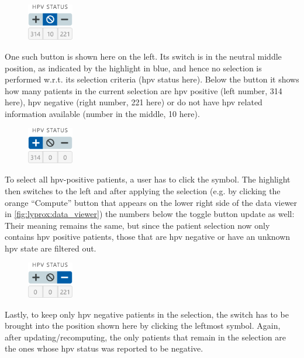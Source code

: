\documentclass[\relativeRoot/main.tex]{subfiles}
\begin{document}
\begin{samepage}
    \setlength\intextsep{0pt}
    \begin{figure}
        \includegraphics[width=0.18\textwidth]{figures/hpv_neutral.png}
    \end{figure}
    One such button is shown here on the left. Its switch is in the neutral middle  position, as indicated by the highlight in blue, and hence no selection is performed w.r.t. its selection criteria (\gls{hpv} status here). Below the button it shows how many patients in the current selection are \gls{hpv} positive (left number, 314 here), \gls{hpv} negative (right number, 221 here) or do not have \gls{hpv} related information available (number in the middle, 10 here).

    \begin{figure}
        \includegraphics[width=0.18\textwidth]{figures/hpv_positive.png}
    \end{figure}
    To select all \gls{hpv}-positive patients, a user has to click the  symbol. The highlight then switches to the left and after applying the selection (e.g. by clicking the orange ``Compute'' button that appears on the lower right side of the data viewer in \cref{fig:lyprox:data_viewer}) the numbers below the toggle button update as well: Their meaning remains the same, but since the patient selection now only contains \gls{hpv} positive patients, those that are \gls{hpv} negative or have an unknown \gls{hpv} state are filtered out.

    \begin{figure}
        \includegraphics[width=0.18\textwidth]{figures/hpv_negative.png}
    \end{figure}
    Lastly, to keep only \gls{hpv} negative patients in the selection, the switch has to be brought into the position shown here by clicking the leftmost  symbol. Again, after updating/recomputing, the only patients that remain in the selection are the ones whose \gls{hpv} status was reported to be negative.

    
\end{samepage}
\end{document}
